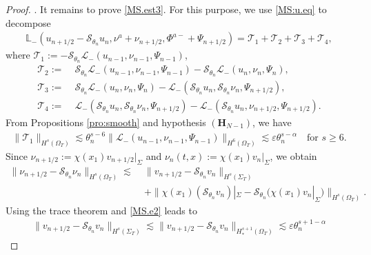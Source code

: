 \documentclass[twoside,11pt]{article}
\numberwithin{equation}{section}
\begin{document}
\begin{proof}
	
	\vspace*{2mm}
	.\quad	
	It remains to prove \eqref{MS.est3}.
	For this purpose,  we use \eqref{MS:u.eq} to decompose
	\begin{align}
		\mathbb{L}_-({u}_{n+1/2}-\mathcal{S}_{\theta_{n}} u_n,\nu^{a}+{\nu}_{n+1/2},\Phi^{a-}+\Psi_{n+1/2})
		=  \mathcal{T}_1+\mathcal{T}_2+\mathcal{T}_3+\mathcal{T}_4, \label{MS.e3}	
	\end{align}
	where $\mathcal{T}_1:= -\mathcal{S}_{\theta_{n}}\mathcal{L}_-( u_{n-1},{\nu}_{n-1},\Psi_{n-1})$,
	\begin{align*}
		\mathcal{T}_2:= \; &
		\mathcal{S}_{\theta_{n}}\mathcal{L}_-( u_{n-1},{\nu}_{n-1},\Psi_{n-1})
		-\mathcal{S}_{\theta_{n}}\mathcal{L}_-(u_n, {\nu}_{n},\Psi_{n}),\\
		\mathcal{T}_3:=\; &\mathcal{S}_{\theta_{n}}\mathcal{L}_-(u_n, {\nu}_{n},\Psi_{n})
		- \mathcal{L}_-(\mathcal{S}_{\theta_{n}} u_n, \mathcal{S}_{\theta_{n}} {\nu}_{n},\Psi_{n+1/2})		,\\
		\mathcal{T}_4:=\; &\mathcal{L}_-(\mathcal{S}_{\theta_{n}} u_n, \mathcal{S}_{\theta_{n}} {\nu}_{n},\Psi_{n+1/2})- \mathcal{L}_-(\mathcal{S}_{\theta_{n}} u_n,{\nu}_{n+1/2},\Psi_{n+1/2}).
	\end{align*}
	From Propositions \ref{pro:smooth} and hypothesis $(\mathbf{H}_{{N}-1})$, we have
	\begin{align}
		\|\mathcal{T}_1\|_{H^{s}(\Omega_{T})}
		\lesssim  \theta_{{n}}^{s-6}
		\|\mathcal{L}_-( u_{n-1},{\nu}_{n-1},\Psi_{n-1})\|_{H^{6}(\Omega_{T})}
		\lesssim \varepsilon \theta_n^{s-{\alpha }}\quad
		\textrm{for  }s\geq 6.
		\label{MS.p5}
	\end{align}	
	Since $\nu_{n+1/2}:=\chi(x_1)v_{n+1/2}|_{\Sigma}$ and $\nu_{n}(t,x):=\chi(x_1)v_{n}|_{\Sigma}$,
	we obtain
	\begin{align} \nonumber
		\big\|\nu_{n+1/2}-\mathcal{S}_{\theta_{{n}}}\nu_{n}\big\|_{H^{s}(\Omega_{T})}
		\lesssim 	\;&  \big\|v_{n+1/2}-\mathcal{S}_{\theta_{{n}}}v_{n} \big\|_{H^s(\Sigma_{T})}\\
		&	+\big\|\chi(x_1)(\mathcal{S}_{\theta_{{n}}}v_n)|_{\Sigma}
		-\mathcal{S}_{\theta_{{n}}}\big(\chi(x_1)v_n|_{\Sigma}\big) \big\|_{H^s(\Omega_{T})}. \label{MS:es9}
	\end{align}
	Using the trace theorem and \eqref{MS.e2} leads to
	\begin{align*}
		\|v_{n+1/2}-\mathcal{S}_{\theta_{{n}}}v_{n} \|_{H^s(\Sigma_{T})}\lesssim
		\|v_{n+1/2}-\mathcal{S}_{\theta_{{n}}}v_{n} \|_{H_*^{s+1}(\Omega_{T})}
		\lesssim  \varepsilon \theta_n^{s+1-{\alpha }}

\end{align*}
\end{proof}
\end{document}
